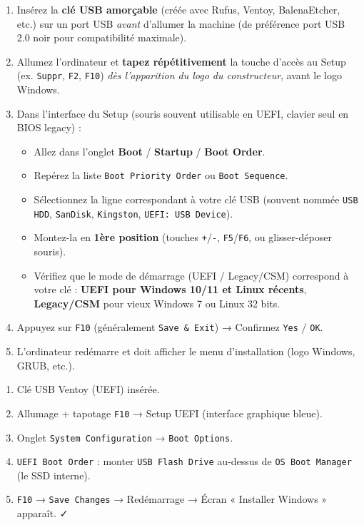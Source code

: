 \documentclass[11pt]{article}
\begin{document}
\begin{methode}
\begin{enumerate}
    \item Insérez la \textbf{clé USB amorçable} (créée avec Rufus, Ventoy, BalenaEtcher, etc.) sur un port USB \emph{avant} d'allumer la machine (de préférence port USB 2.0 noir pour compatibilité maximale).
    \item Allumez l'ordinateur et \textbf{tapez répétitivement} la touche d'accès au Setup (ex. \texttt{Suppr}, \texttt{F2}, \texttt{F10}) \emph{dès l'apparition du logo du constructeur}, avant le logo Windows.
    \item Dans l'interface du Setup (souris souvent utilisable en UEFI, clavier seul en BIOS legacy) :
          \begin{itemize}
              \item Allez dans l'onglet \textbf{Boot} / \textbf{Startup} / \textbf{Boot Order}.
              \item Repérez la liste \texttt{Boot Priority Order} ou \texttt{Boot Sequence}.
              \item Sélectionnez la ligne correspondant à votre clé USB (souvent nommée \texttt{USB HDD}, \texttt{SanDisk}, \texttt{Kingston}, \texttt{UEFI: USB Device}).
              \item Montez-la en \textbf{1ère position} (touches \texttt{+}/\texttt{-}, \texttt{F5}/\texttt{F6}, ou glisser-déposer souris).
              \item Vérifiez que le mode de démarrage (UEFI / Legacy/CSM) correspond à votre clé : \textbf{UEFI pour Windows 10/11 et Linux récents}, \textbf{Legacy/CSM} pour vieux Windows 7 ou Linux 32 bits.
          \end{itemize}
    \item Appuyez sur \texttt{F10} (généralement \texttt{Save \& Exit}) → Confirmez \texttt{Yes} / \texttt{OK}.
    \item L'ordinateur redémarre et doit afficher le menu d'installation (logo Windows, GRUB, etc.).
\end{enumerate}
\end{methode}

\begin{exemplebox}
\begin{enumerate}
    \item Clé USB Ventoy (UEFI) insérée.
    \item Allumage + tapotage \texttt{F10} → Setup UEFI (interface graphique bleue).
    \item Onglet \texttt{System Configuration} → \texttt{Boot Options}.
    \item \texttt{UEFI Boot Order} : monter \texttt{USB Flash Drive} au-dessus de \texttt{OS Boot Manager} (le SSD interne).
    \item \texttt{F10} → \texttt{Save Changes} → Redémarrage → Écran « Installer Windows » apparaît. ✓
\end{enumerate}
\end{exemplebox}
\end{document}
